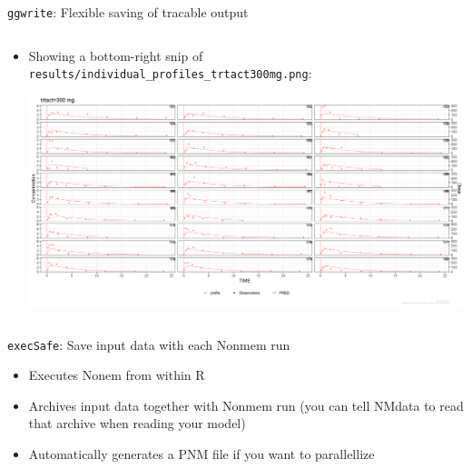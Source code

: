 \documentclass[
  8pt,
  ignorenonframetext,
  aspectratio=169]{beamer}
\providecommand{\tightlist}{%
  \setlength{\itemsep}{0pt}\setlength{\parskip}{0pt}}
\begin{document}
\begin{frame}[fragile]{\texttt{ggwrite}: Flexible saving of tracable
output}
\begin{columns}[T]
\begin{column}{0.48\textwidth}
\begin{itemize}
\tightlist
\item
  Showing a bottom-right snip of
  \texttt{results/individual\_profiles\_trtact300mg.png}:

  \begin{center}
  \includegraphics[trim={30cm 0 0 14cm},clip]{results/individual_profiles_trtact300mg.png}
  \end{center}
\end{itemize}
\end{column}
\end{columns}
\end{frame}

\begin{frame}{\texttt{execSafe}: Save input data with each Nonmem run}
\protect\hypertarget{execsafe-save-input-data-with-each-nonmem-run}{}
\begin{itemize}
\tightlist
\item
  Executes Nonem from within R
\item
  Archives input data together with Nonmem run (you can tell NMdata to
  read that archive when reading your model)
\item
  Automatically generates a PNM file if you want to parallellize
\end{itemize}
\end{frame}
\end{document}
